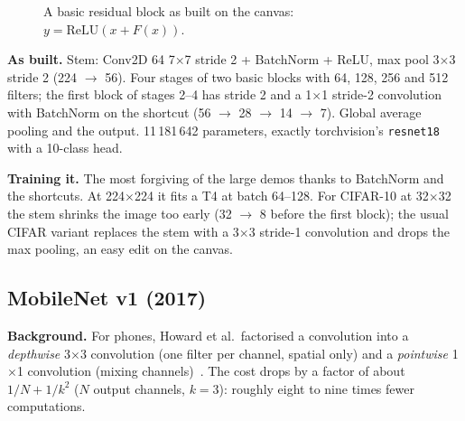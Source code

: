 \documentclass[11pt,a4paper]{article}
\begin{document}
\begin{figure}[htbp]\centering
{}
\caption{A basic residual block as built on the canvas: $y = \mathrm{ReLU}(x + F(x))$.}
\end{figure}

\textbf{As built.} Stem: Conv2D 64 7$\times$7 stride 2 + BatchNorm + ReLU, max pool 3$\times$3 stride 2 (224 $\rightarrow$ 56). Four
stages of two basic blocks with 64, 128, 256 and 512 filters; the first block of stages 2--4 has stride 2 and a 1$\times$1 stride-2
convolution with BatchNorm on the shortcut (56 $\rightarrow$ 28 $\rightarrow$ 14 $\rightarrow$ 7). Global average pooling and the output.
11\,181\,642 parameters, exactly torchvision's \texttt{resnet18} with a 10-class head.

\textbf{Training it.} The most forgiving of the large demos thanks to BatchNorm and the shortcuts. At 224$\times$224 it fits a T4 at batch
64--128. For CIFAR-10 at 32$\times$32 the stem shrinks the image too early (32 $\rightarrow$ 8 before the first block); the usual CIFAR
variant replaces the stem with a 3$\times$3 stride-1 convolution and drops the max pooling, an easy edit on the canvas.

\subsection{MobileNet v1 (2017)}
\textbf{Background.} For phones, Howard et al.\ factorised a convolution into a \emph{depthwise} 3$\times$3 convolution (one filter per
channel, spatial only) and a \emph{pointwise} 1$\times$1 convolution (mixing channels)~\cite{howard2017mobilenets}. The cost drops by a
factor of about $1/N + 1/k^2$ ($N$ output channels, $k=3$): roughly eight to nine times fewer computations.
\end{document}
